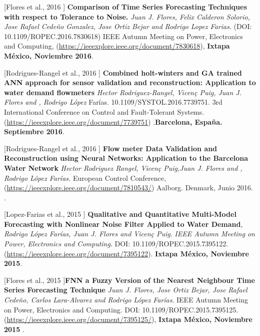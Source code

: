 \begin{innerlist}
\item [[Flores et al., 2016]] \textbf{Comparison of Time Series Forecasting Techniques with respect to Tolerance to Noise.} \textit{Juan J. Flores, Felix Calderon Solorio, Jose Rafael Cede\~no Gonzalez, Jose Ortiz Bejar and Rodrigo Lopez Farias}. (DOI: 10.1109/ROPEC.2016.7830618) {IEEE Autumn Meeting on Power, Electronics and Computing}, (\url{https://ieeexplore.ieee.org/document/7830618}), \textbf{Ixtapa México, Noviembre 2016}.




\item[[Rodrigues-Rangel et al., 2016]] \textbf{Combined holt-winters and GA trained ANN approach for sensor validation and reconstruction: Application to water demand flowmeters} \textit{Hector Rodriguez-Rangel, Vicen\c{c} Puig, Juan J. Flores and ,  Rodrigo López} Farías. 10.1109/SYSTOL.2016.7739751. {3rd International Conference on Control and Fault-Tolerant Systems}.  (\url{https://ieeexplore.ieee.org/document/7739751}) .\textbf{Barcelona, España. Septiembre 2016}.


\item [[Rodrigues-Rangel et al., 2016]] \textbf{Flow meter Data Validation and Reconstruction using Neural Networks: Application to the Barcelona Water Network} \textit{Hector Rodriguez Rangel, Vicen\c{c} Puig,Juan J. Flores and ,  Rodrigo López Farías.} European Control Conference, (\url{https://ieeexplore.ieee.org/document/7810543/}) Aalborg. Denmark, Junio 2016. .

\item [[Lopez-Farias et al., 2015]] \textbf{Qualitative and Quantitative Multi-Model Forecasting with Nonlinear Noise Filter Applied to Water Demand}, \textit{Rodrigo López Farías, Juan J. Flores and Vicen\c{c} Puig}.   \textit{IEEE Autumn Meeting on Power, Electronics and Computing}. DOI: 10.1109/ROPEC.2015.7395122. (\url{https://ieeexplore.ieee.org/document/7395122}). \textbf{Ixtapa México, Noviembre 2015}.

\item [[Flores et al., 2015]]\textbf{FNN a Fuzzy Version of the Nearest Neighbour Time Series Forecasting Technique } \textit{Juan J. Flores, Jose Ortiz Bejar, Jose Rafael Cedeño, Carlos Lara-Alvarez and Rodrigo López Farías}. {IEEE Autumn Meeting on Power, Electronics and Computing}. DOI: 10.1109/ROPEC.2015.7395125. (\url{https://ieeexplore.ieee.org/document/7395125/}), \textbf{Ixtapa México, Noviembre 2015 }.


\end{innerlist}

